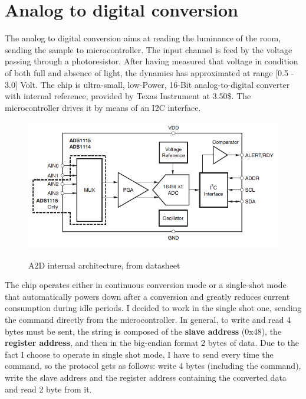 \section{Analog to digital conversion}
The analog to digital conversion aims at reading the luminance of the room, sending the sample to microcontroller. The input channel is feed by the voltage passing through a photoresistor. After having measured that voltage in condition of both full and absence of light, the dynamics has approximated at range [0.5 - 3.0] Volt.
\newline
The chip is ultra-small, low-Power, 16-Bit analog-to-digital converter with internal reference, provided by Texas Instrument at 3.50\$.
The microcontroller drives it by means of an I2C interface.
\begin{figure}[H]
\centering
\includegraphics[scale=.7]{Immagini/06}
\label{06}
\caption{A2D internal architecture, from datasheet}
\end{figure}
The chip operates either in continuous conversion mode or a single-shot mode that automatically powers down after a conversion and greatly reduces current consumption during idle periods. I decided to work in the single shot one, sending the command directly from the microcontroller. 
\newline
\newline
In general, to write and read 4 bytes must be sent, the string is composed of the \textbf{slave address} (0x48), the \textbf{register address}, and then in the big-endian format 2 bytes of data. Due to the fact I choose to operate in single shot mode, I have to send every time the command, so the protocol gets as follows: write 4 bytes (including the command), write the slave address and the register address containing the converted data and read 2 byte from it.
